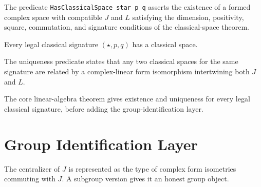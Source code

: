 \begin{definition}
  \label{def:has_classical_space}
  \leanok
  The predicate \texttt{HasClassicalSpace star p q} asserts the existence of a
  formed complex space with compatible \(J\) and \(L\) satisfying the dimension,
  positivity, square, commutation, and signature conditions of the
  classical-space theorem.
\end{definition}

\begin{theorem}
  \label{thm:exists_classical_space}
  \leanok
  Every legal classical signature \((\star,p,q)\) has a classical space.
\end{theorem}

\begin{definition}
  \label{def:unique_classical_spaces}
  \leanok
  The uniqueness predicate states that any two classical spaces for the same
  signature are related by a complex-linear form isomorphism intertwining both
  \(J\) and \(L\).
\end{definition}

\begin{theorem}
  \label{thm:classical_space_existence_and_uniqueness}
  \leanok
  The core linear-algebra theorem gives existence and uniqueness for every
  legal classical signature, before adding the group-identification layer.
\end{theorem}

\section{Group Identification Layer}

\begin{definition}[Centralizer of \(J\)]
  \label{def:complex_form_isometry_centralizer_j}
  \leanok
  The centralizer of \(J\) is represented as the type of complex form isometries
  commuting with \(J\).  A subgroup version gives it an honest group object.
\end{definition}

